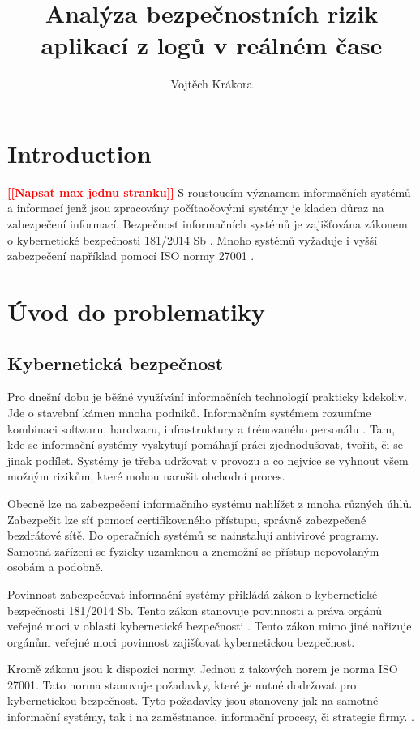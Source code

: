 \documentclass[thesis=M,czech]{FITthesis}[2012/10/20]
\title{Analýza bezpečnostních rizik aplikací z logů v reálném čase}
\author{Vojtěch Krákora} %
\newcommand{\todo}[1]{\textcolor{red}{\textbf{[[#1]]}}}
\newcommand{\blind}[1][1]{\textcolor{gray}{\Blindtext[#1][1]}}
\begin{document}

\chapter{Introduction}
\todo{Napsat max jednu stranku}
S roustoucím významem informačních systémů a informací jenž jsou zpracovány počítaočovými systémy je kladen důraz na zabezpečení informací. Bezpečnost informačních systémů je zajišťována zákonem o kybernetické bezpečnosti 181/2014 Sb \cite{zakon181-2014}. Mnoho systémů vyžaduje i vyšší zabezpečení například pomocí ISO normy 27001 \cite{iso27001}.

\blind[2]


\chapter{Úvod do problematiky}
	
	
	\section{Kybernetická bezpečnost}
		Pro dnešní dobu je běžné využívání informačních technologií prakticky kdekoliv. Jde o stavební kámen mnoha podniků. Informačním systémem rozumíme kombinaci softwaru, hardwaru, infrastruktury a trénovaného personálu \cite{businessdictionary} .  Tam, kde  se informační systémy vyskytují pomáhají práci zjednodušovat, tvořit, či se jinak podílet. Systémy je třeba udržovat v provozu a co nejvíce se vyhnout všem možným rizikům, které mohou narušit obchodní proces.
		
		Obecně lze na zabezpečení informačního systému nahlížet z mnoha různých úhlů. Zabezpečit lze síť pomocí certifikovaného přístupu, správně zabezpečené bezdrátové sítě. Do operačních systémů se nainstalují antivirové programy. Samotná zařízení se fyzicky uzamknou a znemožní se přístup nepovolaným osobám  a podobně.
		
		Povinnost zabezpečovat informační systémy přikládá zákon o kybernetické bezpečnosti 181/2014 Sb. Tento zákon stanovuje povinnosti a práva orgánů veřejné moci v oblasti kybernetické bezpečnosti \cite{zakon181-2014}. Tento zákon mimo jiné nařizuje orgánům veřejné moci povinnost zajišťovat kybernetickou bezpečnost.
		
		Kromě zákonu jsou k dispozici normy. Jednou z takových norem je norma ISO 27001. Tato norma stanovuje požadavky, které je nutné dodržovat pro kybernetickou bezpečnost. Tyto požadavky jsou stanoveny jak na samotné informační systémy, tak i na zaměstnance, informační procesy, či strategie firmy. \cite{iso27001}.
		
\end{document}
